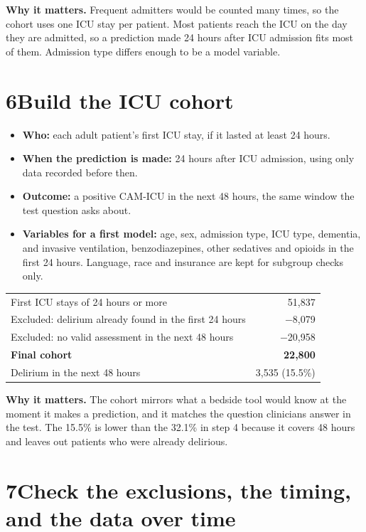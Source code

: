 \documentclass[11pt]{article}
\newcommand{\why}[1]{\begin{whynote}\textbf{\color{accent}Why it matters.} #1\end{whynote}}
\newcommand{\step}[2]{\section*{\color{accent}#1\quad\color{black}#2}}
\begin{document}
\why{Frequent admitters would be counted many times, so the cohort uses one ICU stay per patient. Most patients reach the ICU on the day they are admitted, so a prediction made 24 hours after ICU admission fits most of them. Admission type differs enough to be a model variable.}

\step{6}{Build the ICU cohort}

\begin{itemize}
	\item \textbf{Who:} each adult patient's first ICU stay, if it lasted at least 24 hours.
	\item \textbf{When the prediction is made:} 24 hours after ICU admission, using only data recorded before then.
	\item \textbf{Outcome:} a positive CAM-ICU in the next 48 hours, the same window the test question asks about.
	\item \textbf{Variables for a first model:} age, sex, admission type, ICU type, dementia, and invasive ventilation, benzodiazepines, other sedatives and opioids in the first 24 hours. Language, race and insurance are kept for subgroup checks only.
\end{itemize}

\begin{center}
\begin{tabular}{l r}
	\toprule
	First ICU stays of 24 hours or more & 51,837 \\
	\quad Excluded: delirium already found in the first 24 hours & $-$8,079 \\
	\quad Excluded: no valid assessment in the next 48 hours & $-$20,958 \\
	\midrule
	\textbf{Final cohort} & \textbf{22,800} \\
	Delirium in the next 48 hours & 3,535 (15.5\%) \\
	\bottomrule
\end{tabular}
\end{center}

\why{The cohort mirrors what a bedside tool would know at the moment it makes a prediction, and it matches the question clinicians answer in the test. The 15.5\% is lower than the 32.1\% in step 4 because it covers 48 hours and leaves out patients who were already delirious.}

\step{7}{Check the exclusions, the timing, and the data over time}
\end{document}
